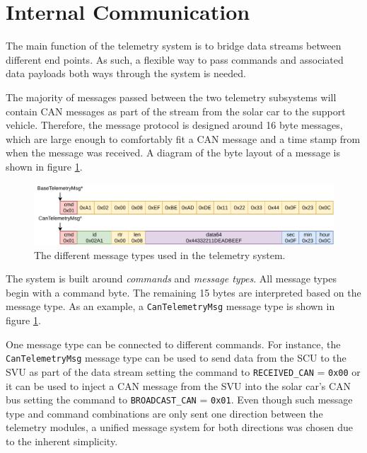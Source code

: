 \documentclass[conference]{IEEEtran}
\begin{document}


\section{Internal Communication}
The main function of the telemetry system is to bridge data streams between different end points. As such, a flexible way to pass commands and associated data payloads both ways through the system is needed. 

The majority of messages passed between the two telemetry subsystems will contain CAN messages as part of the stream from the solar car to the support vehicle. Therefore, the message protocol is designed around 16 byte messages, which are large enough to comfortably fit a CAN message and a time stamp from when the message was received. A diagram of the byte layout of a message is shown in figure \ref{fig:messageTypes}.

\begin{figure}
    \centering
    \includegraphics[width=\linewidth]{documentation/images/MessageTypes.pdf}
    \caption{The different message types used in the telemetry system.}
    \label{fig:messageTypes}
\end{figure}

The system is built around \textit{commands} and \textit{message types}. All message types begin with a command byte. The remaining 15 bytes are interpreted based on the message type. As an example, a \texttt{CanTelemetryMsg} message type is shown in figure \ref{fig:messageTypes}. 

One message type can be connected to different commands. For instance, the \texttt{CanTelemetryMsg} message type can be used to send data from the SCU to the SVU as part of the data stream setting the command to \texttt{RECEIVED\_CAN} = \texttt{0x00} or it can be used to inject a CAN message from the SVU into the solar car's CAN bus setting the command to \texttt{BROADCAST\_CAN} = \texttt{0x01}. Even though such message type and command combinations are only sent one direction between the telemetry modules, a unified message system for both directions was chosen due to the inherent simplicity.
\end{document}
